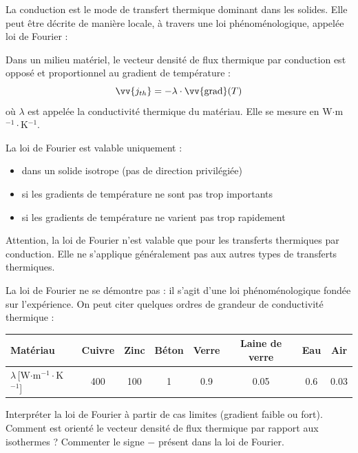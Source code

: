 \documentclass[11pt,fleqn]{book} %
\renewcommand{\grad}{\vv{\mathrm{grad}}}
\begin{document}
La conduction est le mode de transfert thermique dominant dans les solides. Elle peut être décrite de manière locale, à travers une loi phénoménologique, appelée loi de Fourier :
\newpage
\begin{theorem}
	Dans un milieu matériel, le vecteur densité de flux thermique par conduction est opposé et proportionnel au gradient de température :
	\begin{equation}
		\vv{j_{th}} = - \lambda \cdot \grad(T)
	\end{equation}
	où $\lambda$ est appelée la conductivité thermique du matériau. Elle se mesure en W$\cdot$m$^{-1} \cdot$K$^{-1}$.
	
	La loi de Fourier est valable uniquement :
	\begin{itemize}
		\item dans un solide isotrope (pas de direction privilégiée)
		\item si les gradients de température ne sont pas trop importants
		\item si les gradients de température ne varient pas trop rapidement
	\end{itemize} 
\end{theorem}

\begin{remark}
	Attention, la loi de Fourier n'est valable que pour les transferts thermiques par conduction. Elle ne s'applique généralement pas aux autres types de transferts thermiques.
\end{remark}

La loi de Fourier ne se démontre pas : il s'agit d'une loi phénoménologique fondée sur l'expérience. On peut citer quelques ordres de grandeur de conductivité thermique :
\begin{table}[htbp]
	\centering \begin{tabular}{lccccccc}
		\toprule
		Matériau & Cuivre & Zinc & Béton & Verre & Laine de verre & Eau & Air \\
		\midrule
		$\lambda$\,[W$\cdot$m$^{-1} \cdot$K$^{-1}$] & 400 & 100 & 1 & 0.9 & 0.05 & 0.6 & 0.03 \\
		\bottomrule
	\end{tabular}
\end{table}

\begin{capex}
	Interpréter la loi de Fourier à partir de cas limites (gradient faible ou fort). Comment est orienté le vecteur densité de flux thermique par rapport aux isothermes ? Commenter le signe $-$ présent dans la loi de Fourier.
\end{capex}
\end{document}
